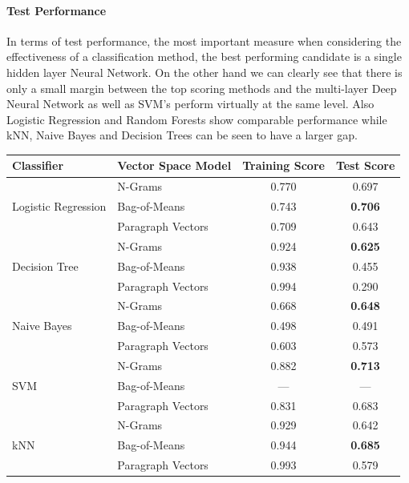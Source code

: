 \paragraph{Test Performance}
\label{par:Test Performance}

In terms of test performance, the most important measure when considering the effectiveness of a classification method, the best performing candidate is a single hidden layer Neural Network. On the other hand we can clearly see that there is only a small margin between the top scoring methods and the multi-layer Deep Neural Network as well as SVM's perform virtually at the same level. Also Logistic Regression and Random Forests show comparable performance while kNN, Naive Bayes and Decision Trees can be seen to have a larger gap.


\begin{table}[h]
  \begin{center}
    \begin{tabular}{ ll cc }
      \toprule
      Classifier & Vector Space Model & Training Score & Test Score \\
      \midrule
      \multirow{3}{*}{Logistic Regression}
       & N-Grams & 0.770 & 0.697 \\
       & Bag-of-Means & 0.743 & \textbf{0.706} \\
       & Paragraph Vectors & 0.709 & 0.643 \\
      \midrule
      \multirow{3}{*}{Decision Tree}
       & N-Grams & 0.924 & \textbf{0.625} \\
       & Bag-of-Means & 0.938 & 0.455 \\
       & Paragraph Vectors & 0.994 & 0.290 \\
      \midrule
      \multirow{3}{*}{Naive Bayes}
       & N-Grams & 0.668 & \textbf{0.648} \\
       & Bag-of-Means & 0.498 & 0.491 \\
       & Paragraph Vectors & 0.603 & 0.573 \\
      \midrule
      \multirow{3}{*}{SVM}
       & N-Grams & 0.882 & \textbf{0.713} \\
       & Bag-of-Means & --- & --- \\
       & Paragraph Vectors & 0.831 & 0.683 \\
      \midrule
      \multirow{3}{*}{kNN}
       & N-Grams & 0.929 & 0.642 \\
       & Bag-of-Means & 0.944 & \textbf{0.685} \\
       & Paragraph Vectors & 0.993 & 0.579 \\

\end{tabular}
\end{center}
\end{table}
